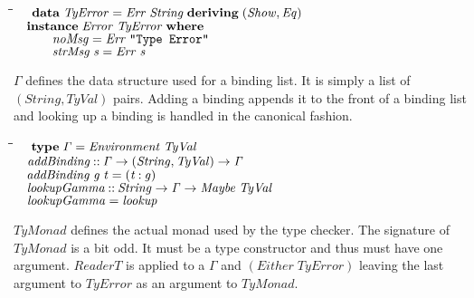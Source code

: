 \documentclass[10pt]{article}
\newlength{\lwidth}\setlength{\lwidth}{4.5cm}
\newlength{\cwidth}\setlength{\cwidth}{8mm} %
\newcommand{\Conid}[1]{\mathit{#1}}
\newcommand{\Varid}[1]{\mathit{#1}}
\begin{document}
\begin{tabbing}
\qquad\=\hspace{\lwidth}\=\hspace{\cwidth}\=\+\kill
${\hskip1.00em\relax\mathbf{data}\;\Conid{TyError}\mathrel{=}\Conid{Err}\;\Conid{String}\;\mathbf{deriving}\;(\Conid{Show},\Conid{Eq})}$\\
${}$\\
${\hskip1.00em\relax\mathbf{instance}\;\Conid{Error}\;\Conid{TyError}\;\mathbf{where}}$\\
${\hskip1.00em\relax\hskip2.00em\relax\Varid{noMsg}\mathrel{=}\Conid{Err}\;\text{\tt \char34 Type~Error\char34}}$\\
${\hskip1.00em\relax\hskip2.00em\relax\Varid{strMsg}\;\Varid{s}\mathrel{=}\Conid{Err}\;\Varid{s}}$
\end{tabbing}
\ensuremath{\Varid{\Gamma}} defines the data structure used for a binding list.  It is
simply a list of \ensuremath{(\Conid{String},\Conid{TyVal})} pairs.  Adding a binding appends it
to the front of a binding list and looking up a binding is handled in
the canonical fashion.

\begin{tabbing}
\qquad\=\hspace{\lwidth}\=\hspace{\cwidth}\=\+\kill
${\hskip1.00em\relax\mathbf{type}\;\Varid{\Gamma}\mathrel{=}\Conid{Environment}\;\Conid{TyVal}}$\\
${}$\\
${\hskip1.00em\relax\Varid{addBinding}\mathbin{::}\Varid{\Gamma}\to (\Conid{String},\Conid{TyVal})\to \Varid{\Gamma}}$\\
${\hskip1.00em\relax\Varid{addBinding}\;\Varid{g}\;\Varid{t}\mathrel{=}(\Varid{t}\mathbin{:}\Varid{g})}$\\
${}$\\
${\hskip1.00em\relax\Varid{lookupGamma}\mathbin{::}\Conid{String}\to \Varid{\Gamma}\to \Conid{Maybe}\;\Conid{TyVal}}$\\
${\hskip1.00em\relax\Varid{lookupGamma}\mathrel{=}\Varid{lookup}}$
\end{tabbing}
\ensuremath{\Conid{TyMonad}} defines the actual monad used by the type checker.  The
signature of \ensuremath{\Conid{TyMonad}} is a bit odd.  It must be a type constructor
and thus must have one argument.  \ensuremath{\Conid{ReaderT}} is applied to a \ensuremath{\Varid{\Gamma}}
and \ensuremath{(\Conid{Either}\;\Conid{TyError})} leaving the last argument to \ensuremath{\Conid{TyError}} as an
argument to \ensuremath{\Conid{TyMonad}}.
\end{document}
